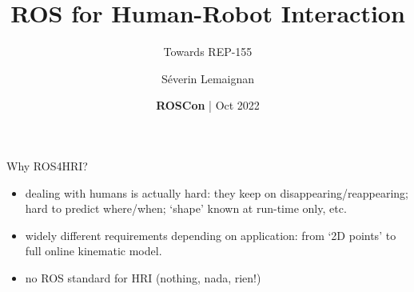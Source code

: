 \documentclass[xcolor=table]{beamer}
\title{\Large ROS for Human-Robot Interaction}
\subtitle{Towards REP-155}
\date{{\bf ROSCon} | Oct 2022}
\author{Séverin Lemaignan}
\institute{{\bf PAL Robotics} Senior Scientist AI \& Social Interactions}
\begin{document}




\maketitle
{}


%
%
%
%

{
\begin{frame}{Why ROS4HRI?}

    \begin{itemize}
        \item  dealing with humans is actually hard: they keep on disappearing/reappearing; hard to predict where/when; ‘shape’ known at run-time only, etc.

\item widely different requirements depending on application: from ‘2D points’ to full online kinematic model.

    \item no ROS standard for HRI (nothing, nada, rien!)
    \end{itemize}

\end{frame}
}
\end{document}
